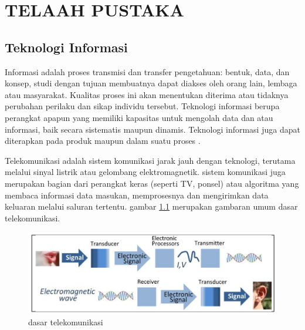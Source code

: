 \chapter{TELAAH PUSTAKA}
\label{cha:2-TelaahPustaka}

\vspace{1cm}
\section{Teknologi Informasi}
\hspace{1,2cm}Informasi adalah proses transmisi dan transfer pengetahuan: bentuk, data, dan konsep, studi dengan tujuan membuatnya dapat diakses oleh orang lain, lembaga atau masyarakat. Kualitas proses ini akan menentukan diterima atau tidaknya perubahan perilaku dan sikap individu tersebut. Teknologi informasi berupa perangkat apapun yang memiliki kapasitas untuk mengolah data dan atau informasi, baik secara sistematis maupun dinamis. Teknologi informasi juga dapat diterapkan pada produk maupun dalam suatu proses \citep{Victoria2020}.

Telekomunikasi adalah sistem komunikasi jarak jauh dengan teknologi, terutama melalui sinyal listrik atau gelombang elektromagnetik. sistem komunikasi juga merupakan bagian dari perangkat keras (seperti TV, ponsel) atau algoritma yang membaca informasi data masukan, memprosesnya dan mengirimkan data keluaran melalui saluran tertentu. gambar \ref{dasar telekomunikasi} merupakan gambaran umum dasar telekomunikasi.

\begin{figure}[H]
	\vspace{-0.1cm}
	\begin{center}
		\includegraphics[width=0.9\columnwidth]{bab2/Gambar/SANDY. dasar telkom.png}
	\end{center}
	\vspace{-0.2cm}
	\caption{dasar telekomunikasi \citep{ElSaba2018}}\label{dasar telekomunikasi}
\end{figure}

